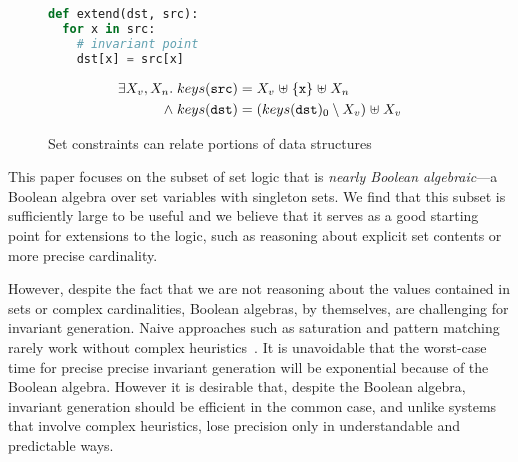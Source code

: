 \begin{figure}[tb]
  \newbox\exprogbox
  \begin{lrbox}{\exprogbox}
    \begin{minipage}[t][1cm][b]{0.4\textwidth}
      \begin{lstlisting}[language=python]
def extend(dst, src):
  for x in src:
    # invariant point
    dst[x] = src[x]
      \end{lstlisting}
    \end{minipage}
  \end{lrbox}
  \newbox\exproginv
  \begin{lrbox}{\exproginv}
    \begin{minipage}[t][0.9cm][b]{0.4\textwidth}
      \begin{align*}
        \exists X_v, X_n. \; keys(\texttt{src})
        & = X_v \mathrel{\uplus} \{\texttt{x}\} \mathrel{\uplus} X_n
        \\
        {} \mathrel{\wedge} keys(\texttt{dst})
        & = (keys(\texttt{dst})_0 \setminus X_v) \mathrel{\uplus} X_v
      \end{align*}
    \end{minipage}
  \end{lrbox}
  \centering
  \quad
  \caption{Set constraints can relate portions of data structures}
  \label{fig:intro-example}
\end{figure}

This paper focuses on the subset of set logic that is \emph{nearly
  Boolean algebraic}---a Boolean algebra over set variables with
singleton sets.
We find that this subset is sufficiently large to be useful and we
believe that it serves as a good starting point for extensions to the
logic, such as reasoning about explicit set contents or more precise
cardinality.

However, despite the fact that we are not reasoning about the values contained in sets or complex cardinalities, Boolean algebras, by themselves, are challenging for invariant generation.  Naive approaches such as saturation and pattern matching rarely work without complex heuristics~\cite{fixbag:cav:11,ab:ecoop:13}.  It is unavoidable that the worst-case time for precise precise invariant generation will be exponential because of the Boolean algebra. However it is desirable that, despite the Boolean algebra, invariant generation should be efficient in the common case, and unlike systems that involve complex heuristics, lose precision only in understandable and predictable ways.

